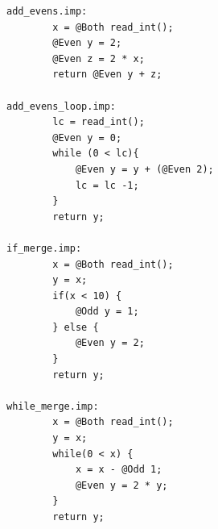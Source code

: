 \documentclass[10pt,conference]{IEEEtran}
\begin{document}
\begin{lstlisting}
add_evens.imp:
        x = @Both read_int();
        @Even y = 2;
        @Even z = 2 * x;
        return @Even y + z;

add_evens_loop.imp:
        lc = read_int();
        @Even y = 0;
        while (0 < lc){
            @Even y = y + (@Even 2);
            lc = lc -1;
        }
        return y;

if_merge.imp:
        x = @Both read_int();
        y = x;
        if(x < 10) {
            @Odd y = 1;
        } else {
            @Even y = 2;
        }
        return y;

while_merge.imp:
        x = @Both read_int();
        y = x;
        while(0 < x) {
            x = x - @Odd 1;
            @Even y = 2 * y;
        }
        return y;

\end{lstlisting}
\end{document}
